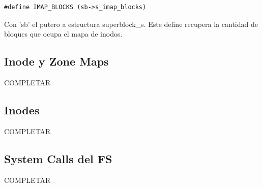 \begin{verbatim}
#define IMAP_BLOCKS (sb->s_imap_blocks)
\end{verbatim}

Con 'sb' el putero a estructura superblock\_s. Este define recupera la cantidad
de bloques que ocupa el mapa de inodos.

\subsection{Inode y Zone Maps}

COMPLETAR

\subsection{Inodes}

COMPLETAR

\subsection{System Calls del FS}

COMPLETAR
